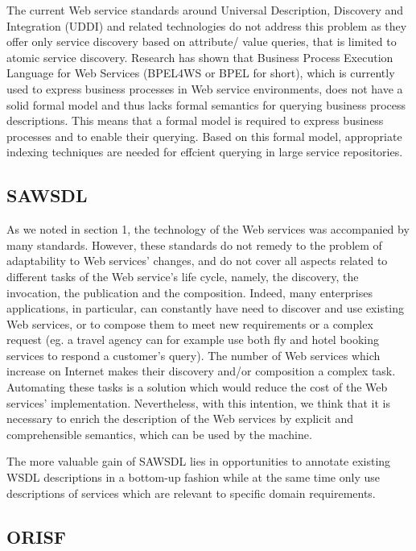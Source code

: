 \documentclass[10pt,a4paper]{article}
\begin{document}
The current Web service standards around Universal
Description, Discovery and Integration (UDDI) and related technologies do not address this
problem as they offer only service discovery based on attribute/ value queries, that is limited
to atomic service discovery. Research has shown that Business Process Execution Language
for Web Services (BPEL4WS or BPEL for short), which is currently used to express business
processes in Web service environments, does not have a solid formal model and thus lacks
formal semantics for querying business process descriptions. This means that a formal model is
required to express business processes and to enable their querying. Based on this formal model,
appropriate indexing techniques are needed for effcient querying in large service repositories. \cite{mothesis}

\subsection{SAWSDL}

As we noted in section 1, the technology of the Web
services was accompanied by many standards. However,
these standards do not remedy to the problem of adaptability
to Web services’ changes, and do not cover all aspects related
to different tasks of the Web service’s life cycle, namely, the
discovery, the invocation, the publication and the
composition. Indeed, many enterprises applications, in
particular, can constantly have need to discover and use
existing Web services, or to compose them to meet new
requirements or a complex request (eg. a travel agency can
for example use both fly and hotel booking services to
respond a customer’s query). The number of Web services
which increase on Internet makes their discovery and/or
composition a complex task. Automating these tasks is a
solution which would reduce the cost of the Web services’
implementation. Nevertheless, with this intention, we think
that it is necessary to enrich the description of the Web
services by explicit and comprehensible semantics, which can
be used by the machine. \cite{ei-sawsdl}

The more valuable
gain of SAWSDL lies in opportunities to annotate existing
WSDL descriptions in a bottom-up fashion while at the
same time only use descriptions of services which are relevant
to specific domain requirements. \cite{WSMOLITE}

\subsection{ORISF}
\end{document}
